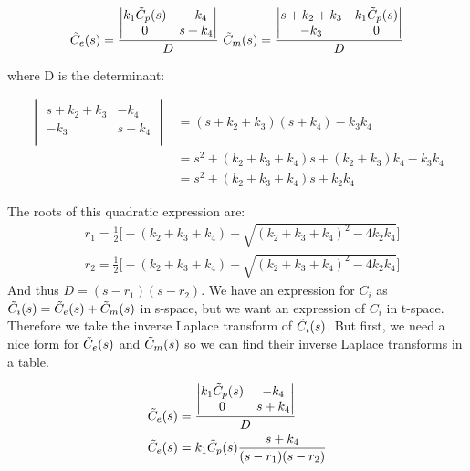 \documentclass[11pt]{article}
\begin{document}
\begin{align*}
  \tilde{ C }_e(s) &= \frac { \begin{vmatrix}
        k_1  \tilde{ C }_p(s) & - k_4  \\
        0 & s + k_4  \\
      \end{vmatrix} } {D} ~
  \tilde{ C }_m(s) = \frac { \begin{vmatrix}
        s + k_2 + k_3  & k_1 \tilde{ C }_p(s)\\
        -k_3 & 0  \\
      \end{vmatrix} } {D} \\
\end{align*}

where D is the determinant:

\begin{align*}
\begin{vmatrix}
        s + k_2 + k_3  & - k_4  \\
        - k_3 & s + k_4  \\
      \end{vmatrix} &= (s + k_2 + k_3) (s+ k_4) - k_3 k_4 \\
      &= s^2 + (k_2 + k_3 + k_4 ) s + (k_2 + k_3) k_4 - k_3 k_4 \\
      &= s^2 + (k_2 + k_3 + k_4) s + k_2 k_4
\end{align*}

The roots of this quadratic expression are:
\begin{align*}
& r_1 = \frac{1}{2} \bigg [ - (k_2 + k_3 + k_4) - \sqrt{ (k_2 + k_3 + k_4)^2 - 4 k_2 k_4} \bigg] \\
& r_2 = \frac{1}{2} \bigg [ - (k_2 + k_3 + k_4) + \sqrt{ (k_2 + k_3 + k_4)^2 - 4 k_2 k_4} \bigg]
\end{align*}
And thus $D = (s - r_1) (s - r_2)$. We have an expression for $C_i$ as $\tilde{ C }_i(s)= \tilde{ C }_e(s) + \tilde{ C }_m(s)$ in s-space, but we want an expression of $C_i$ in t-space.
Therefore we take the inverse Laplace transform of $\tilde{ C }_i(s)$. But first, we need a nice form for $\tilde{ C }_e(s)$ and $\tilde{ C }_m(s)$ so we can
find their inverse Laplace transforms in a table.

\begin{align*}
  \tilde{ C }_e(s) &= \frac { \begin{vmatrix}
        k_1  \tilde{ C }_p(s) & - k_4  \\
        0 & s + k_4  \\
      \end{vmatrix} } {D} \\ 
  \tilde{ C }_e(s) &= k_1  \tilde{ C }_p(s) \frac { s + k_4 }  { (s-r_1) (s-r_2)} \\ 
\end{align*}
\end{document}
